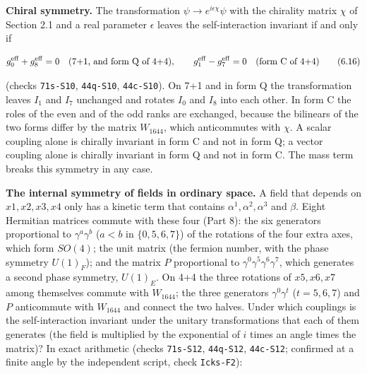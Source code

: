 \documentclass[
  10pt,
]{article}
\begin{document}
\textbf{Chiral symmetry.} The transformation
\(\psi\to e^{i\epsilon\chi}\psi\) with the chirality matrix \(\chi\) of
Section 2.1 and a real parameter \(\epsilon\) leaves the
self-interaction invariant if and only if

\[g_0^{\rm eff}+g_8^{\rm eff}=0\quad\text{(7+1, and form Q of 4+4)},\qquad
g_1^{\rm eff}-g_7^{\rm eff}=0\quad\text{(form C of 4+4)}\tag{6.16}\]

(checks \texttt{71s-S10}, \texttt{44q-S10}, \texttt{44c-S10}). On 7+1
and in form Q the transformation leaves \(I_1\) and \(I_7\) unchanged
and rotates \(I_0\) and \(I_8\) into each other. In form C the roles of
the even and of the odd ranks are exchanged, because the bilinears of
the two forms differ by the matrix \(W_{1644}\), which anticommutes with
\(\chi\). A scalar coupling alone is chirally invariant in form C and
not in form Q; a vector coupling alone is chirally invariant in form Q
and not in form C. The mass term breaks this symmetry in any case.

\textbf{The internal symmetry of fields in ordinary space.} A field that
depends on \(x1,x2,x3,x4\) only has a kinetic term that contains
\(\alpha^1,\alpha^2,\alpha^3\) and \(\beta\). Eight Hermitian matrices
commute with these four (Part 8): the six generators proportional to
\(\gamma^a\gamma^b\) (\(a<b\) in \(\{0,5,6,7\}\)) of the rotations of
the four extra axes, which form \(SO(4)\); the unit matrix (the fermion
number, with the phase symmetry \(U(1)_F\)); and the matrix \(P\)
proportional to \(\gamma^0\gamma^5\gamma^6\gamma^7\), which generates a
second phase symmetry, \(U(1)_E\). On 4+4 the three rotations of
\(x5,x6,x7\) among themselves commute with \(W_{1644}\); the three
generators \(\gamma^0\gamma^t\) (\(t=5,6,7\)) and \(P\) anticommute with
\(W_{1644}\) and connect the two halves. Under which couplings is the
self-interaction invariant under the unitary transformations that each
of them generates (the field is multiplied by the exponential of \(i\)
times an angle times the matrix)? In exact arithmetic (checks
\texttt{71s-S12}, \texttt{44q-S12}, \texttt{44c-S12}; confirmed at a
finite angle by the independent script, check \texttt{Icks-F2}):
\end{document}
